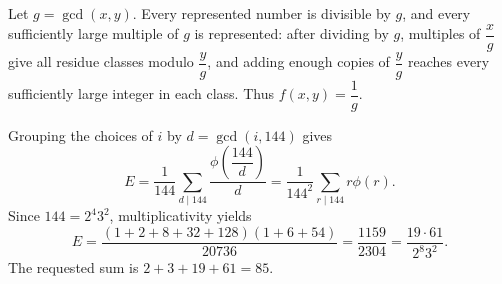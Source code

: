 Let $g=\gcd(x,y)$. Every represented number is divisible by $g$, and every sufficiently large multiple of $g$ is represented: after dividing by $g$, multiples of $\dfrac{x}{g}$ give all residue classes modulo $\dfrac{y}{g}$, and adding enough copies of $\dfrac{y}{g}$ reaches every sufficiently large integer in each class. Thus $f(x,y)=\dfrac{1}{g}$.

Grouping the choices of $i$ by $d=\gcd(i,144)$ gives
\[
E=\dfrac{1}{144}\sum_{d\mid144}\dfrac{\phi(\dfrac{144}{d})}{d}
=\dfrac{1}{144^2}\sum_{r\mid144}r\phi(r).
\]
Since $144=2^4 3^2$, multiplicativity yields
\[
E=\dfrac{(1+2+8+32+128)(1+6+54)}{20736}
=\dfrac{1159}{2304}=\dfrac{19\cdot61}{2^8 3^2}.
\]
The requested sum is $\boxed{2+3+19+61=85}$.
